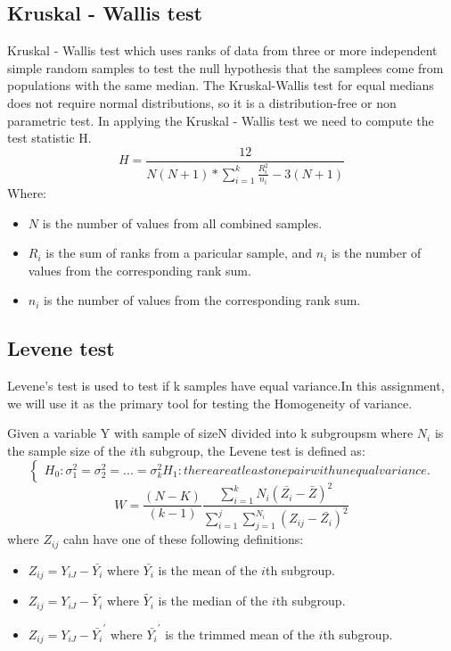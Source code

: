 \subsection{Kruskal - Wallis test}
Kruskal - Wallis test which uses ranks of data from three or more independent simple random samples to test the null hypothesis that the samplees come from populations with the same median.
The Kruskal-Wallis test for equal medians does not require normal distributions, so it is a distribution-free or non parametric test. 
In applying the Kruskal - Wallis test we need to compute the test statistic H.
\[H = \frac{12}{N(N+1)*\sum_{i=1}^{k}\frac{R_i^2}{n_i}-3(N+1)}\]
Where:

\begin{itemize}
    \item $N$ is the number of values from all combined samples.
    \item $R_i$ is the sum of ranks from a paricular sample, and $n_i$ is the number of values from the corresponding rank sum.
    \item $n_i$ is the number of values from the corresponding rank sum.
\end{itemize}

\subsection{Levene test}
Levene's test is used to test if k samples have equal variance.In this assignment, we will use it as the primary tool for testing the Homogeneity of variance.

Given a variable Y with sample of sizeN divided into k subgroupsm where $N_i$ is the sample size of the $i$th subgroup, the Levene test is defined as:
\[
\begin{cases}
    H_0: \sigma_1^2 = \sigma_2^2 =...=\sigma_k^2
    H_1: there are at least one pair with unequal variance.
\end{cases}
\]
\[W = \frac{(N-K)}{(k-1)}\frac{\sum_{i=1}^{k}N_i(\bar{Z_i}-\bar{Z})^2}{\sum_{i=1}^{j}\sum_{j=1}^{N_i}(Z_{ij}-\bar{Z_i})^2}\]
where $Z_{ij}$ cahn have one of these following definitions:

\begin{itemize}
    \item $Z_{ij} = Y_{iJ} - \bar{Y_i}$ where $\bar{Y_i}$ is the mean  of the $i$th subgroup.
    \item $Z_{ij} = Y_{iJ} - \tilde{Y_i}$ where $\tilde{Y_i}$ is the median of the $i$th subgroup.
    \item $Z_{ij} = Y_{iJ} - \bar{Y_i}^{'}$ where $\bar{Y_i}^{'}$ is the trimmed mean of the $i$th subgroup.
\end{itemize}

